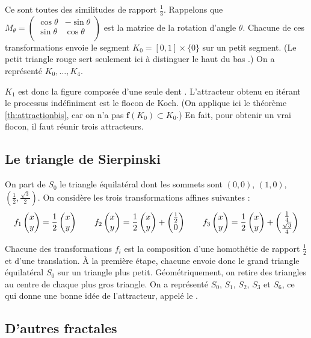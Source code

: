 \documentclass[11pt,class=report,crop=false]{standalone}
\begin{document}
Ce sont toutes des similitudes de rapport $\frac 13$.
Rappelons que $M_\theta = \begin{pmatrix}\cos \theta & -\sin \theta \\ 
\sin\theta & \cos \theta\\ \end{pmatrix}$
est la matrice de la rotation d'angle $\theta$.
Chacune de ces transformations envoie le segment $K_0 = [0,1]\times \{0\}$
sur un petit segment. (Le petit triangle rouge sert seulement ici à distinguer
le \og haut \fg{} du \og bas \fg{}.) On a représenté $K_0,\ldots,K_4$.


$K_1$ est donc la figure composée d'une seule \og dent \fg{}. L'attracteur obtenu en itérant le processus indéfiniment est le flocon de Koch. (On applique ici le théorème \ref{th:attractionbis}, car 
on n'a pas $\mathbf{f}(K_0) \subset K_0$.)
En fait, pour obtenir un vrai flocon, il faut réunir trois attracteurs.


\subsection{Le triangle de Sierpinski}

On part de $S_0$ le triangle équilatéral dont les sommets sont $(0,0)$,
$(1,0)$, $(\frac12,\frac{\sqrt3}{2})$. On considère les trois transformations affines suivantes :
$$f_1 \begin{pmatrix}x \\ y\end{pmatrix} = \frac12 \begin{pmatrix}x \\ y\end{pmatrix} \qquad
f_2\begin{pmatrix}x \\ y\end{pmatrix} = \frac12 \begin{pmatrix}x \\ y\end{pmatrix}+ \begin{pmatrix}\frac12 \\ 0\end{pmatrix} \qquad
f_3\begin{pmatrix}x \\ y\end{pmatrix} = \frac12 \begin{pmatrix}x \\ y\end{pmatrix}+ \begin{pmatrix}\frac14 \\ \frac{\sqrt3}{4}\end{pmatrix}
$$

Chacune des transformations $f_i$ est la composition d'une homothétie de rapport $\frac12$ et d'une translation.
\`A la première étape, chacune envoie donc le grand triangle équilatéral $S_0$ sur un triangle plus petit.
Géométriquement, on retire des triangles au centre de chaque plus gros triangle.
On a représenté $S_0$, $S_1$, $S_2$, $S_3$ et $S_6$, ce qui donne une bonne idée
de l'attracteur, appelé le .



\subsection{D'autres fractales}
\end{document}
